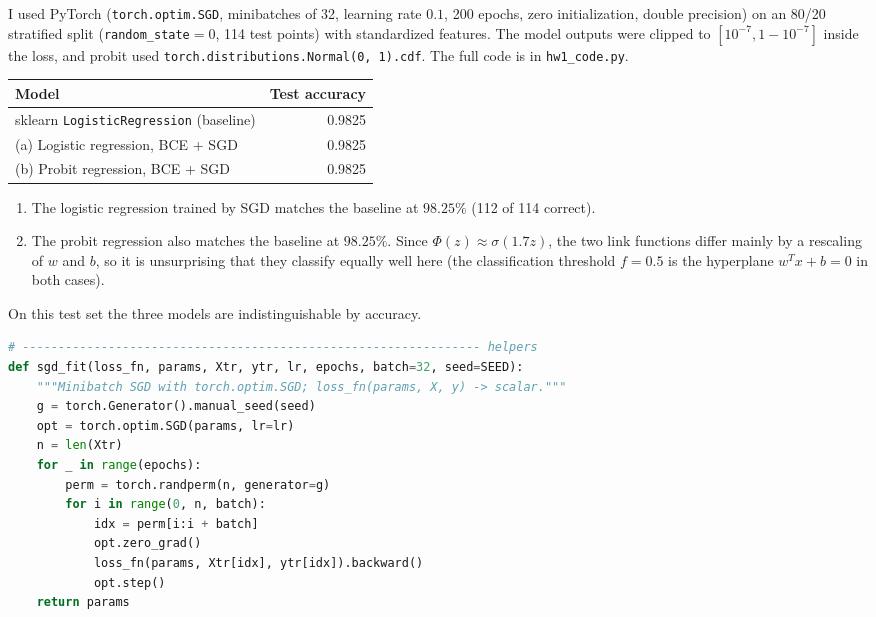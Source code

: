 \documentclass{article}
\newcounter{code}[section]
\begin{document}
\begin{solution}
  I used PyTorch (\texttt{torch.optim.SGD}, minibatches of 32, learning rate $0.1$, 200 epochs, zero initialization, double precision) on an 80/20 stratified split (\texttt{random\_state}$=0$, 114 test points) with standardized features. The model outputs were clipped to $[10^{-7}, 1 - 10^{-7}]$ inside the loss, and probit used \texttt{torch.distributions.Normal(0, 1).cdf}. The full code is in \texttt{hw1\_code.py}.
  \begin{center}
    \begin{tabular}{l r}
      \hline
      Model & Test accuracy \\
      \hline
      sklearn \texttt{LogisticRegression} (baseline) & 0.9825 \\
      (a) Logistic regression, BCE + SGD             & 0.9825 \\
      (b) Probit regression, BCE + SGD               & 0.9825 \\
      \hline
    \end{tabular}
  \end{center}
  \begin{enumerate}[label=(\alph*)]
    \item The logistic regression trained by SGD matches the baseline at $98.25\%$ (112 of 114 correct).
    \item The probit regression also matches the baseline at $98.25\%$. Since $\Phi(z) \approx \sigma(1.7z)$, the two link functions differ mainly by a rescaling of $w$ and $b$, so it is unsurprising that they classify equally well here (the classification threshold $f = 0.5$ is the hyperplane $w^T x + b = 0$ in both cases).
  \end{enumerate}
  On this test set the three models are indistinguishable by accuracy.
  \begin{lstlisting}[language=Python, numbers=none, xleftmargin=0pt, framexleftmargin=0pt, frame=none]
# ---------------------------------------------------------------- helpers
def sgd_fit(loss_fn, params, Xtr, ytr, lr, epochs, batch=32, seed=SEED):
    """Minibatch SGD with torch.optim.SGD; loss_fn(params, X, y) -> scalar."""
    g = torch.Generator().manual_seed(seed)
    opt = torch.optim.SGD(params, lr=lr)
    n = len(Xtr)
    for _ in range(epochs):
        perm = torch.randperm(n, generator=g)
        for i in range(0, n, batch):
            idx = perm[i:i + batch]
            opt.zero_grad()
            loss_fn(params, Xtr[idx], ytr[idx]).backward()
            opt.step()
    return params


\end{lstlisting}
\end{solution}
\end{document}
